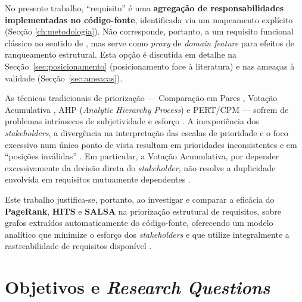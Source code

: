 \begin{notebox}
    No presente trabalho, ``requisito'' é uma \textbf{agregação de
    responsabilidades implementadas no código-fonte}, identificada
    via um mapeamento explícito  (Secção
    \ref{ch:metodologia}). Não corresponde, portanto, a um requisito
    funcional clássico no sentido de \citet{sommerville2007}, mas
    serve como \emph{proxy} de \emph{domain feature} para efeitos de
    ranqueamento estrutural. Esta opção é discutida em detalhe na
    Secção~\ref{sec:posicionamento} (posicionamento face à literatura)
    e nas ameaças à validade (Secção~\ref{sec:ameacas}).
\end{notebox}

As técnicas tradicionais de priorização --- Comparação em Pares
\parencite{karlsson2007}, Votação Acumulativa
\parencite{leffingwell2003, ahl2005}, AHP (\emph{Analytic Hierarchy
Process}) \parencite{saaty1980, karlsson1997} e PERT/CPM
\parencite{kerzner2009} --- sofrem de problemas intrínsecos de
subjetividade e esforço \parencite{firesmith2004}. A inexperiência dos
\emph{stakeholders}, a divergência na interpretação das escalas de
prioridade e o foco excessivo num único ponto de vista resultam em
prioridades inconsistentes e em ``posições inválidas''
\parencite{silva2018}. Em particular, a Votação Acumulativa, por
depender excessivamente da decisão direta do \emph{stakeholder}, não
resolve a duplicidade envolvida em requisitos mutuamente dependentes
\parencite{silva2018}.

Este trabalho justifica-se, portanto, ao investigar e comparar a
eficácia do \textbf{PageRank}, \textbf{HITS} e \textbf{SALSA} na
priorização estrutural de requisitos, sobre grafos extraídos
automaticamente do código-fonte, oferecendo um modelo analítico que
minimize o esforço dos \emph{stakeholders} e que utilize integralmente
a rastreabilidade de requisitos disponível
\parencite{gotel1994, rasiman2022}.

\section{Objetivos e \emph{Research Questions}}
\label{sec:objetivos}

